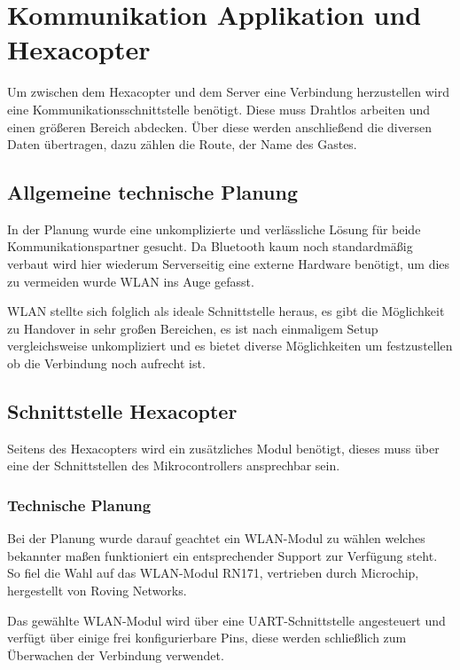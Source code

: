 \chapter{Kommunikation Applikation und Hexacopter}
\renewcommand{\kapitelautor}{Autor: Katharina Joksch, Lucas Ullrich}
Um zwischen dem Hexacopter und dem Server eine Verbindung herzustellen wird eine Kommunikationsschnittstelle benötigt. Diese muss Drahtlos arbeiten und einen größeren Bereich
abdecken. Über diese werden anschließend die diversen Daten übertragen, dazu zählen \zB die Route, \bzw der Name des Gastes.

\section{Allgemeine technische Planung}
In der Planung wurde eine unkomplizierte und verlässliche Lösung für beide Kommunikationspartner gesucht. Da Bluetooth kaum noch standardmäßig verbaut wird hier wiederum
Serverseitig eine externe Hardware benötigt, um dies zu vermeiden wurde WLAN ins Auge gefasst.

WLAN stellte sich folglich als ideale Schnittstelle heraus,
es gibt die Möglichkeit zu Handover in sehr großen Bereichen, es ist nach einmaligem Setup vergleichsweise unkompliziert und es bietet diverse Möglichkeiten um festzustellen
ob die Verbindung noch aufrecht ist.

\section{Schnittstelle Hexacopter}
Seitens des Hexacopters wird ein zusätzliches Modul benötigt, dieses muss über eine der Schnittstellen des Mikrocontrollers ansprechbar sein.

  \subsection{Technische Planung}
  Bei der Planung wurde darauf geachtet ein WLAN-Modul zu wählen welches bekannter maßen funktioniert \bzw ein entsprechender Support zur Verfügung steht.
  So fiel die Wahl auf das WLAN-Modul RN171, vertrieben durch Microchip, hergestellt von Roving Networks.

  Das gewählte WLAN-Modul wird über eine UART-Schnittstelle angesteuert und verfügt über einige frei konfigurierbare Pins, diese werden schließlich zum Überwachen der
  Verbindung verwendet.

